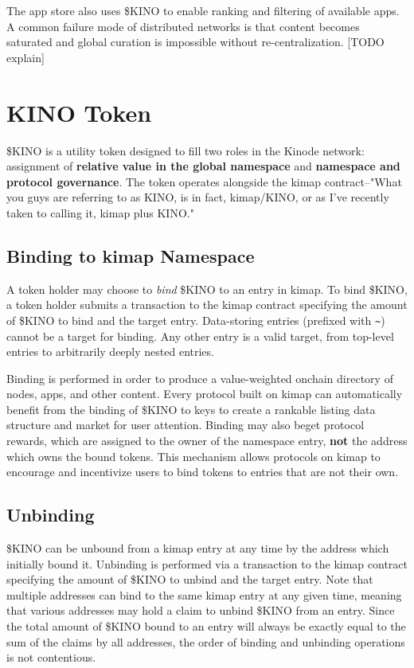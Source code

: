 \documentclass[runningheads]{llncs}
\begin{document}
The app store also uses \$KINO to enable ranking and filtering of available apps.
A common failure mode of distributed networks is that content becomes saturated and global curation is impossible without re-centralization. [TODO explain]

\section{KINO Token}

\$KINO is a utility token designed to fill two roles in the Kinode network: assignment of \textbf{relative value in the global namespace} and \textbf{namespace and protocol governance}.
The token operates alongside the kimap contract–"What you guys are referring to as KINO, is in fact, kimap/KINO, or as I've recently taken to calling it, kimap plus KINO."

\subsection{Binding to kimap Namespace}

A token holder may choose to \textit{bind} \$KINO to an entry in kimap.
To bind \$KINO, a token holder submits a transaction to the kimap contract specifying the amount of \$KINO to bind and the target entry.
Data-storing entries (prefixed with \verb|~|) cannot be a target for binding.
Any other entry is a valid target, from top-level entries to arbitrarily deeply nested entries.

Binding is performed in order to produce a value-weighted onchain directory of nodes, apps, and other content.
Every protocol built on kimap can automatically benefit from the binding of \$KINO to keys to create a rankable listing data structure and market for user attention.
Binding may also beget protocol rewards, which are assigned to the owner of the namespace entry, \textbf{not} the address which owns the bound tokens.
This mechanism allows protocols on kimap to encourage and incentivize users to bind tokens to entries that are not their own.

\subsection{Unbinding}

\$KINO can be unbound from a kimap entry at any time by the address which initially bound it.
Unbinding is performed via a transaction to the kimap contract specifying the amount of \$KINO to unbind and the target entry.
Note that multiple addresses can bind to the same kimap entry at any given time, meaning that various addresses may hold a claim to unbind \$KINO from an entry. Since the total amount of \$KINO bound to an entry will always be exactly equal to the sum of the claims by all addresses, the order of binding and unbinding operations is not contentious.
\end{document}

